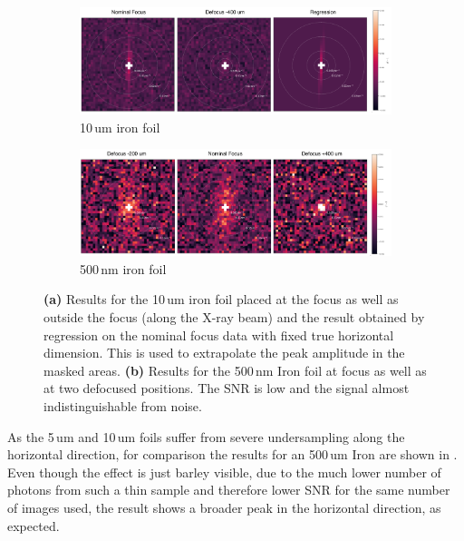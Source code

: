 \begin{figure}
	\centering
	\begin{subfigure}[b]{0.9\textwidth}
		\includegraphics[width=\linewidth]{images/Fe10um_reco2d.pdf}
		\caption{10\,um iron foil}
		\label{fig:fe10umreco2d}
	\end{subfigure}
	\begin{subfigure}[b]{0.9\textwidth}
		\includegraphics[width=\linewidth]{images/Fe500nm_reco2d.pdf}
		\caption{500\,nm iron foil}
		\label{fig:fe500nmreco2d}
	\end{subfigure}
	\caption[Results Iron Foils]{\textbf{(a)} Results for the 10\,um iron foil placed at the focus as well as outside the focus (along the X-ray beam) and the result obtained by regression on the nominal focus data with fixed true horizontal dimension. This is used to extrapolate the peak amplitude in the masked areas. \textbf{(b)} Results for the 500\,nm Iron foil at focus as well as at two defocused positions. The SNR is low and the signal almost indistinguishable from noise.}
	\label{fig:fereco2d}
\end{figure}

As the 5\,um and 10\,um foils suffer from severe undersampling along the horizontal direction, for comparison the results for an 500\,um Iron are shown in . Even though the effect is just barley visible, due to the much lower number of photons from such a thin sample and therefore lower SNR for the same number of images used, the result shows a broader peak in the horizontal direction, as expected.


